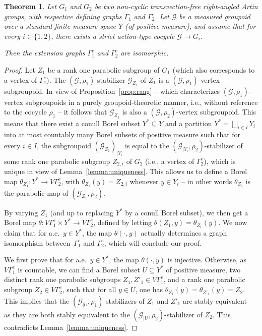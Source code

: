 \documentclass[11pt]{article}
\newcommand{\ie}{i.e.,\xspace}
\numberwithin{equation}{section}
\let\mathcal\mathscr
\theoremstyle{plain}
\newtheorem{theo}{Theorem}[section]
\theoremstyle{definition}
\let\Dunion\bigsqcup
\newcommand{\calg}{\mathcal{G}}
\begin{document}
\begin{theo}\label{theo:main-2}
Let $G_1$ and $G_2$ be two non-cyclic transvection-free right-angled Artin groups, with respective defining graphs $\Gamma_1$ and $\Gamma_2$. Let $\calg$ be a measured groupoid over a standard finite measure space $Y$ (of positive measure), and assume that for every $i\in\{1,2\}$, there exists a strict action-type cocycle $\calg\to G_i$.

Then the extension graphs $\Gamma_1^e$ and $\Gamma_2^e$ are isomorphic.
\end{theo}

\begin{proof}
Let $Z_1$ be a rank one parabolic subgroup of $G_1$ (which also corresponds to a vertex of $\Gamma_1^e$). The $(\calg,\rho_1)$-stabilizer $\calg_{Z_1}$ of $Z_1$ is a $(\calg,\rho_1)$-vertex subgroupoid. In view of Proposition~\ref{prop:raag} -- which characterizes $(\calg,\rho_1)$-vertex subgroupoids in a purely groupoid-theoretic manner, \ie without reference to the cocycle $\rho_1$ -- it follows that $\calg_{Z_1}$ is also a $(\calg,\rho_2)$-vertex subgroupoid. This means that there exist a conull Borel subset $Y^*\subseteq Y$ and a partition $Y^*=\Dunion_{i\in I} Y_i$ into at most countably many Borel subsets of positive measure such that for every $i\in I$, the subgroupoid $(\calg_{Z_1})_{|Y_i}$ is equal to the $(\calg_{|Y_i},\rho_2)$-stabilizer of some rank one parabolic subgroup $Z_{2,i}$ of $G_2$ (\ie a vertex of $\Gamma_2^e$), which is unique in view of Lemma~\ref{lemma:uniqueness}. This allows us to define a Borel map $\theta_{Z_1}:Y^*\to V\Gamma_2^e$, with $\theta_{Z_1}(y)=Z_{2,i}$ whenever $y\in Y_i$ -- in other words $\theta_{Z_1}$ is the parabolic map of $(\calg_{Z_1},\rho_2)$.

By varying $Z_1$ (and up to replacing $Y^*$ by a conull Borel subset), we then get a Borel map $\theta:V\Gamma_1^e\times Y^*\to V\Gamma_2^e$, defined by letting $\theta(Z_1,y)=\theta_{Z_1}(y)$. We now claim that for a.e.\ $y\in Y^*$, the map $\theta(\cdot,y)$ actually determines a graph isomorphism between~$\Gamma_1^e$ and $\Gamma_2^e$, which will conclude our proof.

We first prove that for a.e.\ $y\in Y^*$, the map $\theta(\cdot,y)$ is injective. Otherwise, as $V\Gamma_1^e$ is countable, we can find a Borel subset $U\subseteq Y^*$ of positive measure, two distinct rank one parabolic subgroups $Z_1,Z'_1\in V\Gamma^e_1$, and a rank one parabolic subgroup $Z_2\in V\Gamma_2^e$, such that for all $y\in U$, one has $\theta_{Z_1}(y)=\theta_{Z'_1}(y)=Z_2$. This implies that the $(\calg_{|U},\rho_1)$-stabilizers of $Z_1$ and $Z'_1$ are stably equivalent -- as they are both stably equivalent to the $(\calg_{|U},\rho_2)$-stabilizer of $Z_2$. This contradicts Lemma~\ref{lemma:uniqueness}.


\end{proof}
\end{document}
